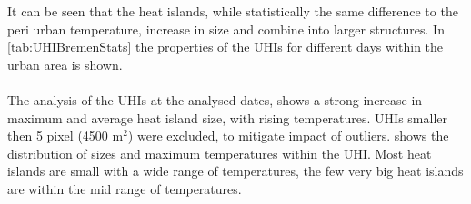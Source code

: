 \documentclass[12pt,a4paper, english,twoside]{scrartcl}
\begin{document}
      It can be seen that the heat islands, while statistically the same difference to the peri urban temperature, increase in size and combine into larger structures. 
      In \cref{tab:UHIBremenStats} the properties of the \glspl{UHI} for different days within the urban area is shown.\\ \\
     \noindent
    The analysis of the \glspl{UHI} at the analysed dates, shows a strong increase in maximum and average heat island size, with rising temperatures. 
    \Glspl{UHI} smaller then 5 pixel (4500 m$^2$) were excluded, to mitigate impact of outliers. 
     shows the distribution of sizes and maximum temperatures within the \gls{UHI}.
    Most heat islands are small with a wide range of temperatures, the few very big heat islands are within the mid range of temperatures. 
\end{document}
